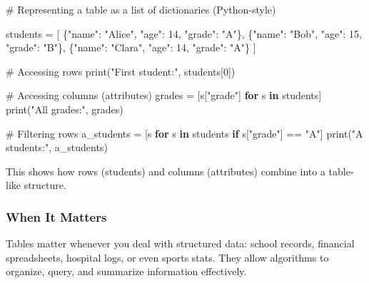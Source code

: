 \documentclass[
  letterpaper,
  DIV=11,
  numbers=noendperiod]{scrreprt}
\newenvironment{Shaded}{\begin{snugshade}}{\end{snugshade}}
\newcommand{\BuiltInTok}[1]{\textcolor[rgb]{0.00,0.23,0.31}{#1}}
\newcommand{\CommentTok}[1]{\textcolor[rgb]{0.37,0.37,0.37}{#1}}
\newcommand{\ControlFlowTok}[1]{\textcolor[rgb]{0.00,0.23,0.31}{\textbf{#1}}}
\newcommand{\DecValTok}[1]{\textcolor[rgb]{0.68,0.00,0.00}{#1}}
\newcommand{\KeywordTok}[1]{\textcolor[rgb]{0.00,0.23,0.31}{\textbf{#1}}}
\newcommand{\NormalTok}[1]{\textcolor[rgb]{0.00,0.23,0.31}{#1}}
\newcommand{\OperatorTok}[1]{\textcolor[rgb]{0.37,0.37,0.37}{#1}}
\newcommand{\StringTok}[1]{\textcolor[rgb]{0.13,0.47,0.30}{#1}}
\begin{document}
\begin{Shaded}
\begin{Highlighting}[]
\CommentTok{\# Representing a table as a list of dictionaries (Python{-}style)}

\NormalTok{students }\OperatorTok{=}\NormalTok{ [}
\NormalTok{    \{}\StringTok{"name"}\NormalTok{: }\StringTok{"Alice"}\NormalTok{, }\StringTok{"age"}\NormalTok{: }\DecValTok{14}\NormalTok{, }\StringTok{"grade"}\NormalTok{: }\StringTok{"A"}\NormalTok{\},}
\NormalTok{    \{}\StringTok{"name"}\NormalTok{: }\StringTok{"Bob"}\NormalTok{, }\StringTok{"age"}\NormalTok{: }\DecValTok{15}\NormalTok{, }\StringTok{"grade"}\NormalTok{: }\StringTok{"B"}\NormalTok{\},}
\NormalTok{    \{}\StringTok{"name"}\NormalTok{: }\StringTok{"Clara"}\NormalTok{, }\StringTok{"age"}\NormalTok{: }\DecValTok{14}\NormalTok{, }\StringTok{"grade"}\NormalTok{: }\StringTok{"A"}\NormalTok{\}}
\NormalTok{]}

\CommentTok{\# Accessing rows}
\BuiltInTok{print}\NormalTok{(}\StringTok{"First student:"}\NormalTok{, students[}\DecValTok{0}\NormalTok{])}

\CommentTok{\# Accessing columns (attributes)}
\NormalTok{grades }\OperatorTok{=}\NormalTok{ [s[}\StringTok{"grade"}\NormalTok{] }\ControlFlowTok{for}\NormalTok{ s }\KeywordTok{in}\NormalTok{ students]}
\BuiltInTok{print}\NormalTok{(}\StringTok{"All grades:"}\NormalTok{, grades)}

\CommentTok{\# Filtering rows}
\NormalTok{a\_students }\OperatorTok{=}\NormalTok{ [s }\ControlFlowTok{for}\NormalTok{ s }\KeywordTok{in}\NormalTok{ students }\ControlFlowTok{if}\NormalTok{ s[}\StringTok{"grade"}\NormalTok{] }\OperatorTok{==} \StringTok{"A"}\NormalTok{]}
\BuiltInTok{print}\NormalTok{(}\StringTok{"A students:"}\NormalTok{, a\_students)}
\end{Highlighting}
\end{Shaded}

This shows how rows (students) and columns (attributes) combine into a
table-like structure.

\subsubsection{When It Matters}\label{when-it-matters-51}

Tables matter whenever you deal with structured data: school records,
financial spreadsheets, hospital logs, or even sports stats. They allow
algorithms to organize, query, and summarize information effectively.
\end{document}

